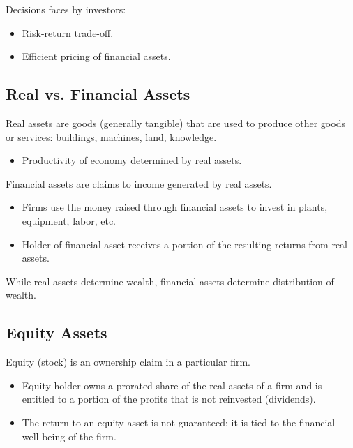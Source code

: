 \documentclass[letterpaper,10pt,english]{sphinxmanual}
\begin{document}
Decisions faces by investors:
\begin{itemize}
\item {} 
Risk-return trade-off.

\end{itemize}
\begin{itemize}
\item {} 
Efficient pricing of financial assets.

\end{itemize}


\subsection{Real vs. Financial Assets}
\label{assetClasses:real-vs-financial-assets}
Real assets are goods (generally tangible) that are used to produce
other goods or services: buildings, machines, land, knowledge.
\begin{itemize}
\item {} 
Productivity of economy determined by real assets.

\end{itemize}

Financial assets are claims to income generated by real assets.
\begin{itemize}
\item {} 
Firms use the money raised through financial assets to invest in
plants, equipment, labor, etc.

\end{itemize}
\begin{itemize}
\item {} 
Holder of financial asset receives a portion of the resulting
returns from real assets.

\end{itemize}

While real assets determine wealth, financial assets determine
distribution of wealth.


\subsection{Equity Assets}
\label{assetClasses:equity-assets}
Equity (stock) is an ownership claim in a particular firm.
\begin{itemize}
\item {} 
Equity holder owns a prorated share of the real assets of a firm and
is entitled to a portion of the profits that is not reinvested
(dividends).

\end{itemize}
\begin{itemize}
\item {} 
The return to an equity asset is not guaranteed: it is tied to the
financial well-being of the firm.

\end{itemize}
\end{document}
